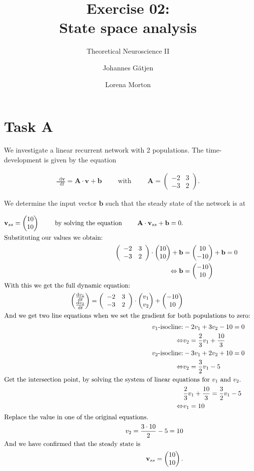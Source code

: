 \documentclass{scrartcl}
\title{Exercise 02:\\State space analysis}
\subtitle{Theoretical Neuroscience II}
\author{Johannes G\"atjen \and Lorena Morton}
\newcommand*\diff{\mathop{}\!\mathrm{d}}
\newcommand*\colvec[3][]{
    \begin{pmatrix}\ifx\relax#1\relax\else#1\\\fi#2\\#3\end{pmatrix}
}
\begin{document}
\maketitle

\section{Task A}

We investigate a linear recurrent network with 2 populations. The time-development is given by the equation

\begin{align*}
\frac{\diff \mathbf{v}}{\diff t} = \mathbf{A} \cdot \mathbf{v} + \mathbf{b} \qquad \text{ with } \qquad \mathbf{A} =  \left( \begin{array}{cc}
-2 & 3 \\
-3 & 2 \end{array} \right).
\end{align*}

We determine the input vector $\mathbf{b}$ such that the steady state of the network is at

\begin{align*}
\mathbf{v}_{ss} = \colvec{10}{10} \qquad \text{ by solving the equation } \qquad \mathbf{A} \cdot \mathbf{v}_{ss} + \mathbf{b} = 0. \\
\shortintertext{Substituting our values we obtain:}
\left( \begin{array}{cc}
-2 & 3 \\
-3 & 2 \end{array} \right) \cdot \colvec{10}{10} + \mathbf{b} &= \colvec{10}{-10} + \mathbf{b} = 0 \\
\Leftrightarrow  \mathbf{b} &= \colvec{-10}{10} \\
\shortintertext{With this we get the full dynamic equation:}
\colvec{\frac{\diff v_1}{\diff t}}{\frac{\diff v_2}{\diff t}} =  \left( \begin{array}{cc}
-2 & 3 \\
-3 & 2 \end{array} \right) \cdot \colvec{v_1}{v_2} + \colvec{-10}{10} \\
\shortintertext{And we get two line equations when we set the gradient for both populations to zero:}
\text{$v_1$-isocline:} & -2 v_1 + 3 v_2 - 10 = 0 \\
\Leftrightarrow & v_2 = \frac{2}{3} v_1 + \frac{10}{3} \\
\text{$v_2$-isocline:} & -3 v_1 + 2 v_2 + 10 = 0 \\
\Leftrightarrow & v_2 = \frac{3}{2} v_1 - 5 \\
\shortintertext{Get the intersection point, by solving the system of linear equations for $v_1$ and $v_2$.}
& \frac{2}{3} v_1 + \frac{10}{3} = \frac{3}{2} v_1 - 5 \\
\Leftrightarrow & v_1 = 10 \\
\shortintertext{Replace the value in one of the original equations.}
v_2 = \frac{3 \cdot 10}{2} - 5 = 10 \\
\shortintertext{And we have confirmed that the steady state is}
\mathbf{v}_{ss} = \colvec{10}{10}.
\end{align*}
\end{document}

